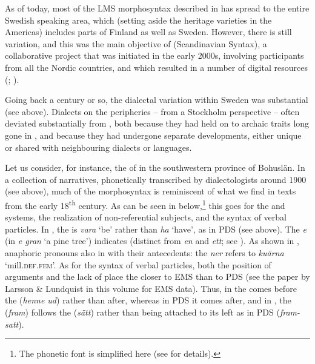 \documentclass[output=paper]{langscibook}
\begin{document}
As of today, most of the LMS morphosyntax described in  has spread to the entire Swedish speaking area, which (setting aside the heritage varieties in the Americas) includes parts of Finland as well as Sweden. However, there is still variation, and this was the main objective of  (Scandinavian  Syntax), a collaborative project that was initiated in the early 2000s, involving participants from all the Nordic countries, and which resulted in a number of digital resources (\citealt{JohannessenEtAl2009}; \citealt{LindstadEtAl2009}).



Going back a century or so, the dialectal variation within Sweden was substantial (see  above). Dialects on the peripheries – from a Stockholm perspective – often deviated substantially from , both because they had held on to archaic traits long gone in , and because they had undergone separate developments, either unique or shared with neighbouring dialects or languages.



Let us consider, for instance, the  of  in the southwestern province of Bohuslän. In a collection of  narratives, phonetically transcribed by dialectologists around 1900 (see  above), much of the morphosyntax is reminiscent of what we find in texts from the early 18\textsuperscript{th} century. As can be seen in  below,\footnote{The phonetic font is simplified here (see \citealt{Petzell2019,Petzell2020} for details).} this goes for the  and  systems, the realization of non-referential subjects, and the syntax of verbal particles. In , the  is \textit{vara} ‘be’ rather than \textit{ha} ‘have’, as in PDS (see  above). The  \textit{e} (in \textit{e gran} ‘a pine tree’) indicates   (distinct from  \textit{en} and  \textit{ett}; see ). As shown in , anaphoric pronouns also  in  with their antecedents: the   \textit{ner} refers to \textit{kuärna} ‘mill.\textsc{def}.\textsc{fem}’. As for the syntax of verbal particles, both the position of arguments and the lack of   place the   closer to EMS than to PDS (see the paper by Larsson \& Lundquist in this volume for EMS data). Thus, in  the  comes before the  (\textit{henne ud}) rather than after, whereas in PDS it comes after, and in , the  (\textit{fram}) follows the  (\textit{sätt}) rather than being attached to its left as in PDS (\textit{fram-satt}).
\end{document}
